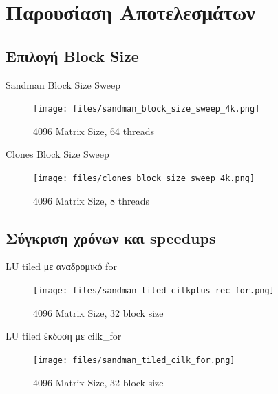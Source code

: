 \documentclass{beamer}
\begin{document}
\section{Παρουσίαση Αποτελεσμάτων}

\subsection{Επιλογή Block Size}
    \begin{frame}
        \begin{block}{Sandman Block Size Sweep}
            \begin{figure}[H]
                \centering
                \texttt{[image: files/sandman\_block\_size\_sweep\_4k.png]}
                \caption{4096 Matrix Size, 64 threads}
            \end{figure}
        \end{block}
    \end{frame}

    \begin{frame}
        \begin{block}{Clones Block Size Sweep}
            \begin{figure}[H]
                \centering
                \texttt{[image: files/clones\_block\_size\_sweep\_4k.png]}
                \caption{4096 Matrix Size, 8 threads}
            \end{figure}
        \end{block}
    \end{frame}

\subsection{Σύγκριση χρόνων και speedups}
\begin{frame}
    \begin{block}{LU tiled με αναδρομικό for}
        \begin{figure}[H]
            \centering
            \texttt{[image: files/sandman\_tiled\_cilkplus\_rec\_for.png]}
            \caption{4096 Matrix Size, 32 block size}
        \end{figure}
    \end{block}
\end{frame}


\begin{frame}
    \begin{block}{LU tiled έκδοση με cilk\_for}
        \begin{figure}[H]
            \centering
            \texttt{[image: files/sandman\_tiled\_cilk\_for.png]}
            \caption{4096 Matrix Size, 32 block size}
        \end{figure}
    \end{block}
\end{frame}
\end{document}
